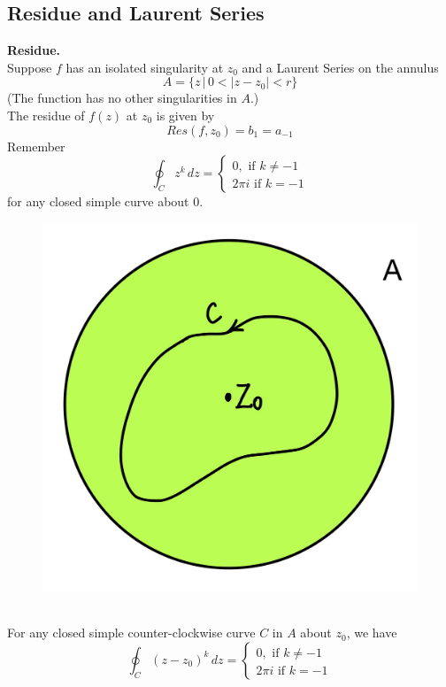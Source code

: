 \documentclass[11pt]{article}
\begin{document}
\subsection{Residue and Laurent Series}
\textbf{Residue.} \\
Suppose $f$ has an isolated singularity at $z_0$ and a Laurent Series on the annulus 
$$A = \{z\,|\, 0 < |z - z_0| < r\}$$
(The function has no other singularities in $A$.) \\
The residue of $f(z)$ at $z_0$ is given by 
$$Res(f, z_0) = b_1 = a_{-1}$$
\newline
Remember 
$$
\oint_C z^k \, dz = 
\begin{cases}
	0, \mbox{ if } k \neq -1 \\
	2\pi i \mbox{ if } k = -1
\end{cases}
$$
for any closed simple curve about 0. \\
\begin{figure}[h]
\includegraphics[scale=0.17]{20_1} 
\centering
\end{figure}
\\
For any closed simple counter-clockwise curve $C$ in $A$ about $z_0$, we have 
$$
\oint_C (z - z_0)^k \, dz = 
\begin{cases}
	0, \mbox{ if } k \neq -1 \\
	2\pi i \mbox{ if } k = -1
\end{cases}
$$
\end{document}
